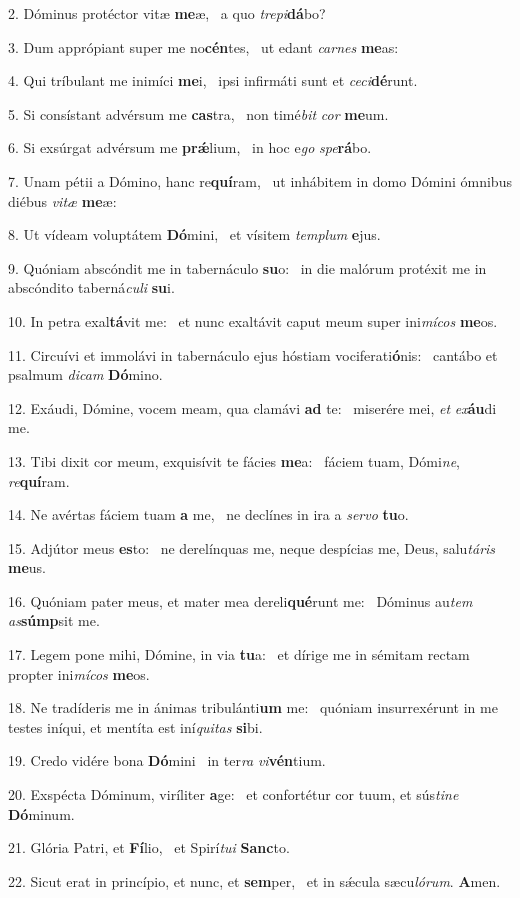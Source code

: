 2. Dóminus protéctor vitæ \textbf{me}æ, \ast\  a quo \textit{tre}\textit{pi}\textbf{dá}bo?\

3. Dum apprópiant super me no\textbf{cén}tes, \ast\  ut edant \textit{car}\textit{nes} \textbf{me}as:\

4. Qui tríbulant me inimíci \textbf{me}i, \ast\  ipsi infirmáti sunt et \textit{ce}\textit{ci}\textbf{dé}runt.\

5. Si consístant advérsum me \textbf{cas}tra, \ast\  non timé\textit{bit} \textit{cor} \textbf{me}um.\

6. Si exsúrgat advérsum me \textbf{prǽ}lium, \ast\  in hoc e\textit{go} \textit{spe}\textbf{rá}bo.\

7. Unam pétii a Dómino, hanc re\textbf{quí}ram, \ast\  ut inhábitem in domo Dómini ómnibus diébus \textit{vi}\textit{tæ} \textbf{me}æ:\

8. Ut vídeam voluptátem \textbf{Dó}mini, \ast\  et vísitem \textit{tem}\textit{plum} \textbf{e}jus.\

9. Quóniam abscóndit me in tabernáculo \textbf{su}o: \ast\  in die malórum protéxit me in abscóndito taberná\textit{cu}\textit{li} \textbf{su}i.\

10. In petra exal\textbf{tá}vit me: \ast\  et nunc exaltávit caput meum super ini\textit{mí}\textit{cos} \textbf{me}os.\

11. Circuívi et immolávi in tabernáculo ejus hóstiam vociferati\textbf{ó}nis: \ast\  cantábo et psalmum \textit{di}\textit{cam} \textbf{Dó}mino.\

12. Exáudi, Dómine, vocem meam, qua clamávi \textbf{ad} te: \ast\  miserére mei, \textit{et} \textit{ex}\textbf{áu}di me.\

13. Tibi dixit cor meum, exquisívit te fácies \textbf{me}a: \ast\  fáciem tuam, Dómi\textit{ne}, \textit{re}\textbf{quí}ram.\

14. Ne avértas fáciem tuam \textbf{a} me, \ast\  ne declínes in ira a \textit{ser}\textit{vo} \textbf{tu}o.\

15. Adjútor meus \textbf{es}to: \ast\  ne derelínquas me, neque despícias me, Deus, salu\textit{tá}\textit{ris} \textbf{me}us.\

16. Quóniam pater meus, et mater mea dereli\textbf{qué}runt me: \ast\  Dóminus au\textit{tem} \textit{as}\textbf{súmp}sit me.\

17. Legem pone mihi, Dómine, in via \textbf{tu}a: \ast\  et dírige me in sémitam rectam propter ini\textit{mí}\textit{cos} \textbf{me}os.\

18. Ne tradíderis me in ánimas tribulánti\textbf{um} me: \ast\  quóniam insurrexérunt in me testes iníqui, et mentíta est iní\textit{qui}\textit{tas} \textbf{si}bi.\

19. Credo vidére bona \textbf{Dó}mini \ast\  in ter\textit{ra} \textit{vi}\textbf{vén}tium.\

20. Exspécta Dóminum, viríliter \textbf{a}ge: \ast\  et confortétur cor tuum, et sús\textit{ti}\textit{ne} \textbf{Dó}minum.\

21. Glória Patri, et \textbf{Fí}lio, \ast\  et Spirí\textit{tu}\textit{i} \textbf{Sanc}to.\

22. Sicut erat in princípio, et nunc, et \textbf{sem}per, \ast\  et in sǽcula sæcu\textit{ló}\textit{rum}. \textbf{A}men.\

